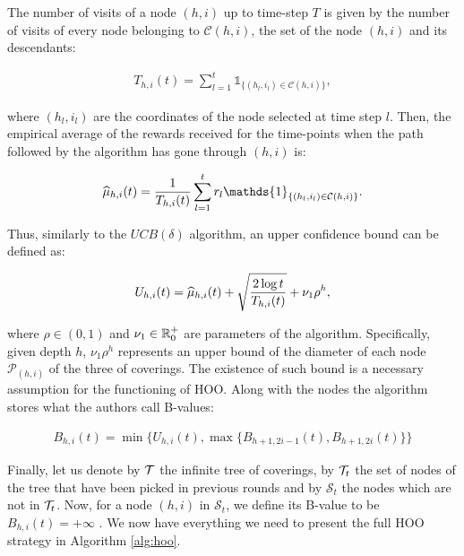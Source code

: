 The number of visits of a node $(h,i)$ up to time-step $T$ is given by the number of visits of every node belonging to $\mathcal{C}(h,i)$, \ie the set of the node $(h,i)$ and its descendants:

\begin{align}
T_{h,i}(t) = \sum_{l=1}^{t}\mathds{1}_{\{(h_l, i_l)\in\mathcal{C}(h,i)\}},
\end{align}

where $(h_l, i_l)$ are the coordinates of the node selected at time step $l$. Then, the empirical average of the rewards received for the time-points when the path followed by the algorithm has gone through $(h,i)$ is:

\begin{align}
\wh{\mu}_{h,i}(t) = \frac{1}{T_{h,i}(t)}\sum_{l=1}^{t}r_l\mathds{1}_{\{(h_l, i_l)\in\mathcal{C}(h,i)\}}.
\end{align}

Thus, similarly to the $UCB(\delta)$ algorithm, an upper confidence bound can be defined as:

\begin{align}
U_{h,i}(t) = \widehat{\mu}_{h,i}(t) + \sqrt{\frac{2\log{t}}{T_{h,i}(t)}} + \nu_1\rho^h,
\end{align}

where $\rho\in(0,1)$ and $\nu_1\in\mathbb{R}^+_0$ are parameters of the algorithm. Specifically, given depth $h$, $\nu_1\rho^h$ represents an upper bound of the diameter of each node $\mathcal{P}_{(h, i)}$ of the three of coverings. The existence of such bound is a necessary assumption for the functioning of \gls{HOO}. Along with the nodes the algorithm stores what the authors call B-values:

\begin{align}
B_{h,i}(t) = \min\{U_{h,i}(t), \max\{B_{h+1,2i-1}(t), B_{h+1,2i}(t)\}\}
\end{align}

Finally, let us denote by $\mathcal{T}$ the infinite tree of coverings, by $\mathcal{T}_t$ the set of nodes of the tree that have been picked in previous rounds and by $\mathcal{S}_t$ the nodes which are not in $\mathcal{T}_t$. Now, for a node $(h,i)$ in $\mathcal{S}_t$, we define
its B-value to be $B_{h,i}(t)=+\infty$ . We now have everything we need to present the full \gls{HOO} strategy in Algorithm \ref{alg:hoo}.

